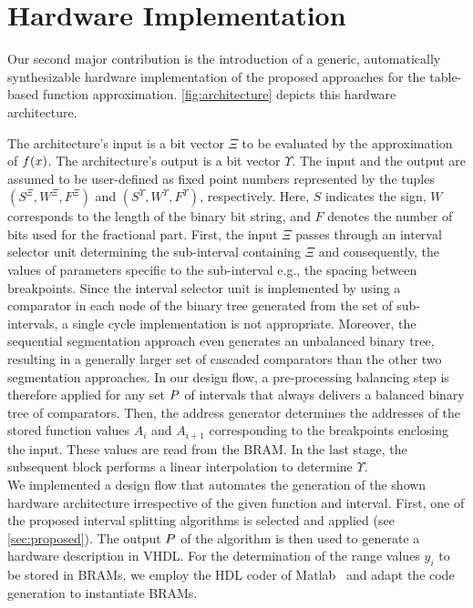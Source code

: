 \section{Hardware Implementation}
\label{sec:hardware}
Our second major contribution is the introduction of a generic, automatically synthesizable hardware implementation of the proposed approaches for the table-based function approximation.
\cref{fig:architecture} depicts this hardware architecture.\par
The architecture's input is a bit vector $\Xi$ to be evaluated by the approximation of $f(x)$.
The architecture's output is a bit vector $\Upsilon$.
The input and the output are assumed to be user-defined as fixed point numbers represented by the tuples $(S^{\Xi},W^{\Xi},F^{\Xi})$ and $(S^\Upsilon,W^\Upsilon,F^\Upsilon)$, respectively.
Here, $S$ indicates the sign, $W$ corresponds to the length of the binary bit string, and $F$ denotes the number of bits used for the fractional part.
First, the input $\Xi$ passes through an interval selector unit determining the sub-interval containing $\Xi$ and consequently, the values of parameters specific to the sub-interval e.g., the spacing between breakpoints.
Since the interval selector unit is implemented by using a comparator in each node of the binary tree generated from the set of sub-intervals, a single cycle implementation is not appropriate.
Moreover, the sequential segmentation approach even generates an unbalanced binary tree, resulting in a generally larger set of cascaded comparators than the other two segmentation approaches. 
In our design flow, a pre-processing balancing step is therefore applied for any set $P$ of intervals that always delivers a balanced binary tree of comparators.
Then, the address generator determines the addresses of the stored function values $A_i$ and $A_{i+1}$ corresponding to the  breakpoints enclosing the input.
These values are read from the \ac{BRAM}.
In the last stage, the subsequent block performs a linear interpolation to determine $\Upsilon$.\\
We implemented a design flow that automates the generation of the shown hardware architecture irrespective of the given function and interval.
First, one of the proposed interval splitting algorithms is selected and applied (see \cref{sec:proposed}).
The output $P$ of the algorithm is then used to generate a hardware description in VHDL.
For the determination of the range values $y_i$ to be stored in BRAMs, we employ the HDL coder of Matlab~\cite{MATLAB:2019} and adapt the code generation to instantiate \acp{BRAM}.
